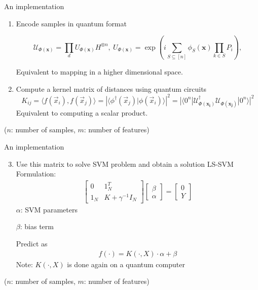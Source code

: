 \begin{frame}{An implementation}
    \begin{enumerate}
        \item Encode samples in quantum format
        
        $$ \mathcal{U}_{\Phi(\mathbf{x})}=\prod_d U_{\Phi(\mathbf{x})}H^{\otimes n},\ U_{\Phi(\mathbf{x})}=\exp\left(i\sum_{S\subseteq[n]}\phi_S(\mathbf{x})\prod_{k\in S} P_i\right), $$
        
        Equivalent to mapping in a higher dimensional space.
        \vspace{0.5mm}
        \item Compute a kernel matrix of distances using quantum circuits
        $$K_{ij} = \langle f(\vec{x}_i), f(\vec{x}_j) \rangle = \left| \langle \phi^\dagger(\vec{x}_j)| \phi(\vec{x}_i) \rangle \right|^{2} = 
        |\langle 0^n |\mathcal{U}_{\Phi(\mathbf{x_i})}^{\dagger}\mathcal{U}_{\Phi(\mathbf{x_j})}| 0^n \rangle |^2
        $$
        Equivalent to computing a scalar product.
    \end{enumerate}
    
    ($n$: number of samples, $m$: number of features)
\end{frame}

\begin{frame}{An implementation}
    \begin{enumerate}
      \setcounter{enumi}{2}
        \item Use this matrix to solve SVM problem and obtain a solution
        LS-SVM Formulation:
            \begin{align*}
            \begin{bmatrix}
            0 & 1^T_N \\
            1_N & K+\gamma^{-1}I_N 
            \end{bmatrix}
            \begin{bmatrix}
            \beta \\
            \alpha
            \end{bmatrix} = 
            \begin{bmatrix}
            0 \\
            Y
            \end{bmatrix}
            \end{align*}
        $\alpha$: SVM parameters
        
        $\beta$: bias term
        
        Predict as
        \begin{align*}
        f(\cdot) = K( \cdot,X) \cdot \alpha + \beta
        \end{align*}
        Note: $K( \cdot,X)$ is done again on a quantum computer
    \end{enumerate}
    
    ($n$: number of samples, $m$: number of features)
\end{frame}



